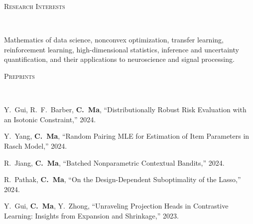 \documentclass[a4paper, 10pt]{article}
\newenvironment{changemargin}[2]{%
  \begin{list}{}{%
    \setlength{\topsep}{0pt}%
    \setlength{\leftmargin}{#1}%
    \setlength{\rightmargin}{#2}%
    \setlength{\listparindent}{\parindent}%
    \setlength{\itemindent}{\parindent}%
    \setlength{\parsep}{\parskip}%
  }%
  \item[]}{\end{list}
}
\newcommand{\lineover}{
	\begin{changemargin}{-0.05in}{-0.05in}
		\vspace*{-8pt}
		\hrulefill \\
		\vspace*{-2pt}
	\end{changemargin}
}
\newcommand{\header}[1]{
	\begin{changemargin}{-0.5in}{-0.5in}
		\scshape{#1}\\
  	\lineover
	\end{changemargin}
}
\newenvironment{body} {
	\vspace*{-16pt}
	\begin{changemargin}{-0.3in}{-0.5in}
  }	
	{\end{changemargin}
}
\begin{document}
\bigskip
\header{\LARGE{Research Interests}}
\begin{body}
\vspace{18pt}
Mathematics of data science, nonconvex optimization,  transfer learning, reinforcement learning, high-dimensional statistics, inference and uncertainty quantification, and their applications to neuroscience and signal processing.
\end{body}


%



\bigskip
\header{\LARGE{Preprints}}
\begin{body}
	\vspace{18pt}
	\begin{enumerate}[label={[{P}{{\arabic*}}]}]
	
\item Y.~Gui, R.~F.~Barber, \textbf{C.~Ma}, ``Distributionally Robust Risk Evaluation with an Isotonic Constraint,'' 2024.

\item Y.~Yang, \textbf{C.~Ma}, ``Random Pairing MLE for Estimation of Item Parameters in Rasch Model,'' 2024.

\item R.~Jiang, \textbf{C.~Ma}, ``Batched Nonparametric Contextual Bandits,'' 2024.


\item R.~Pathak, \textbf{C.~Ma}, ``On the Design-Dependent Suboptimality of the Lasso,'' 2024.
\item Y.~Gui, \textbf{C.~Ma}, Y.~Zhong, ``Unraveling Projection Heads in Contrastive Learning: Insights from Expansion and Shrinkage,'' 2023.










	\end{enumerate}
\end{body}
\end{document}
